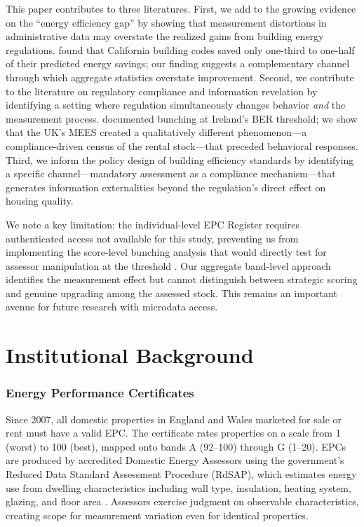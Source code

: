 \documentclass[12pt]{article}
\begin{document}
This paper contributes to three literatures. First, we add to the growing evidence on the ``energy efficiency gap'' \citep{allcott2014short, gerarden2017assessing} by showing that measurement distortions in administrative data may overstate the realized gains from building energy regulations. \citet{levinson2016energy} found that California building codes saved only one-third to one-half of their predicted energy savings; our finding suggests a complementary channel through which aggregate statistics overstate improvement. Second, we contribute to the literature on regulatory compliance and information revelation \citep{kleven2016bunching, houde2018consumer, costa2014energy} by identifying a setting where regulation simultaneously changes behavior \textit{and} the measurement process. \citet{collins2018bunching} documented bunching at Ireland's BER threshold; we show that the UK's MEES created a qualitatively different phenomenon---a compliance-driven census of the rental stock---that preceded behavioral responses. Third, we inform the policy design of building efficiency standards \citep{fowlie2018energy, christensen2024housing} by identifying a specific channel---mandatory assessment as a compliance mechanism---that generates information externalities beyond the regulation's direct effect on housing quality.

We note a key limitation: the individual-level EPC Register requires authenticated access not available for this study, preventing us from implementing the score-level bunching analysis that would directly test for assessor manipulation at the threshold \citep{kleven2013using, cattaneo2020manipulation}. Our aggregate band-level approach identifies the measurement effect but cannot distinguish between strategic scoring and genuine upgrading among the assessed stock. This remains an important avenue for future research with microdata access.

\section{Institutional Background}

\subsubsection*{Energy Performance Certificates} Since 2007, all domestic properties in England and Wales marketed for sale or rent must have a valid EPC. The certificate rates properties on a scale from 1 (worst) to 100 (best), mapped onto bands A (92--100) through G (1--20). EPCs are produced by accredited Domestic Energy Assessors using the government's Reduced Data Standard Assessment Procedure (RdSAP), which estimates energy use from dwelling characteristics including wall type, insulation, heating system, glazing, and floor area \citep{beis2021epc}. Assessors exercise judgment on observable characteristics, creating scope for measurement variation even for identical properties.
\end{document}
